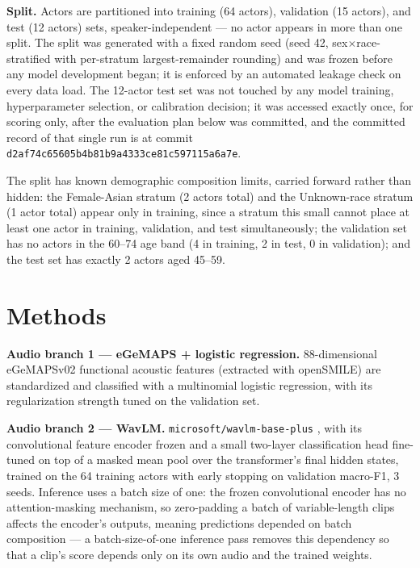 \documentclass[10pt]{article}
\begin{document}
\textbf{Split.} Actors are partitioned into training (64 actors), validation (15 actors), and test (12
actors) sets, speaker-independent --- no actor appears in more than one split. The split was generated with a
fixed random seed (seed 42, sex$\times$race-stratified with per-stratum largest-remainder rounding) and
was frozen before any model development began; it is enforced by an automated leakage check on every
data load. The 12-actor test set was not touched by any model training, hyperparameter selection, or
calibration decision; it was accessed exactly once, for scoring only, after the evaluation plan below was
committed, and the committed record of that single run is at commit
\texttt{d2af74c65605b4b81b9a4333ce81c597115a6a7e}.

The split has known demographic composition limits, carried forward rather than hidden: the
Female-Asian stratum (2 actors total) and the Unknown-race stratum (1 actor total) appear only in
training, since a stratum this small cannot place at least one actor in training, validation, and test
simultaneously; the validation set has no actors in the 60--74 age band (4 in training, 2 in test, 0 in
validation); and the test set has exactly 2 actors aged 45--59.

\section{Methods}

\textbf{Audio branch 1 --- eGeMAPS + logistic regression.} 88-dimensional eGeMAPSv02 functional acoustic
features \citep{eyben2016gemaps} (extracted with openSMILE) are standardized and classified with a multinomial logistic
regression, with its regularization strength tuned on the validation set.

\textbf{Audio branch 2 --- WavLM.} \texttt{microsoft/wavlm-base-plus} \citep{chen2022wavlm}, with its convolutional feature encoder frozen
and a small two-layer classification head fine-tuned on top of a masked mean pool over the transformer's
final hidden states, trained on the 64 training actors with early stopping on validation macro-F1, 3
seeds. Inference uses a batch size of one: the frozen convolutional encoder has no attention-masking
mechanism, so zero-padding a batch of variable-length clips affects the encoder's outputs, meaning
predictions depended on batch composition --- a batch-size-of-one inference pass removes this dependency
so that a clip's score depends only on its own audio and the trained weights.
\end{document}
